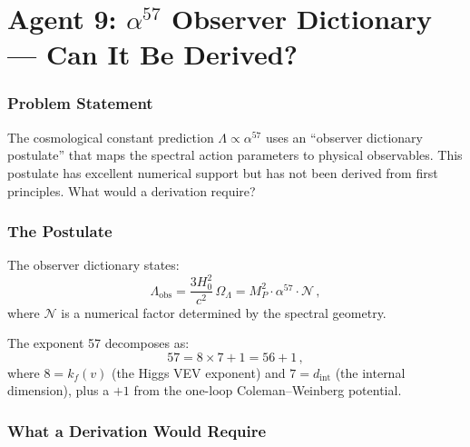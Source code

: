 \documentclass[11pt,a4paper]{article}
\begin{document}
\part{Agent 9: $\alpha^{57}$ Observer Dictionary --- Can It Be Derived?}
\label{part:alpha57}

\section{Problem Statement}

The cosmological constant prediction $\Lambda \propto \alpha^{57}$ uses an ``observer dictionary postulate'' that maps the spectral action parameters to physical observables. This postulate has excellent numerical support but has not been derived from first principles. What would a derivation require?

\section{The Postulate}

The observer dictionary states:
\begin{equation}
\Lambda_{\mathrm{obs}} = \frac{3H_0^2}{c^2}\,\Omega_\Lambda = M_P^2 \cdot \alpha^{57} \cdot \mathcal{N}\,,
\end{equation}
where $\mathcal{N}$ is a numerical factor determined by the spectral geometry.

The exponent 57 decomposes as:
\begin{equation}
57 = 8 \times 7 + 1 = 56 + 1\,,
\end{equation}
where $8 = k_f(v)$ (the Higgs VEV exponent) and $7 = d_{\mathrm{int}}$ (the internal dimension), plus a $+1$ from the one-loop Coleman--Weinberg potential.

\section{What a Derivation Would Require}
\end{document}
